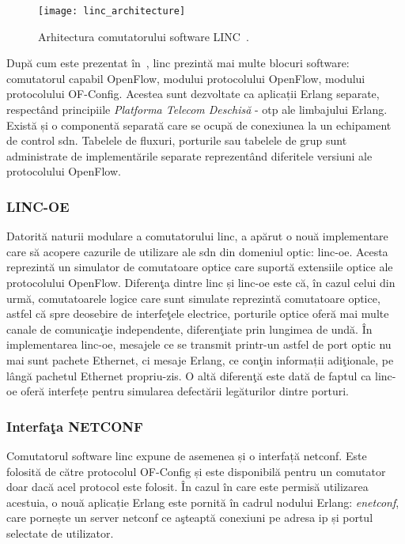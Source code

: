 \begin{figure}[h]
	\centering
	\texttt{[image: linc\_architecture]}
	\caption{Arhitectura comutatorului software LINC~\cite{linc2014qsg}.}
	\label{fig:linc_architecture}
\end{figure}

După cum este prezentat în~\cite{linc2014qsg}, \gls{linc} prezintă mai multe blocuri software: comutatorul capabil OpenFlow, modului protocolului OpenFlow, modului protocolului OF-Config. Acestea sunt dezvoltate ca aplicații Erlang separate, respectând principiile \textit{Platforma Telecom Deschisă} - \gls{otp} ale limbajului Erlang. Există și o componentă separată care se ocupă de conexiunea la un echipament de control \gls{sdn}. Tabelele de fluxuri, porturile sau tabelele de grup sunt administrate de implementările separate reprezentând diferitele versiuni ale protocolului OpenFlow.

\subsubsection{LINC-OE}

Datorită naturii modulare a comutatorului \gls{linc}, a apărut o nouă implementare care să acopere cazurile de utilizare ale \gls{sdn} din domeniul optic: \gls{linc-oe}. Acesta reprezintă un simulator de comutatoare optice care suportă extensiile optice ale protocolului OpenFlow. Diferenţa dintre \gls{linc} și \gls{linc-oe} este că, în cazul celui din urmă, comutatoarele logice care sunt simulate reprezintă comutatoare optice, astfel că spre deosebire de interfeţele electrice, porturile optice oferă mai multe canale de comunicaţie independente, diferenţiate prin lungimea de undă. În implementarea \gls{linc-oe}, mesajele ce se transmit printr-un astfel de port optic nu mai sunt pachete Ethernet, ci mesaje Erlang, ce conţin informații adiţionale, pe lângă pachetul Ethernet propriu-zis. O altă diferenţă este dată de faptul ca \gls{linc-oe} oferă interfețe pentru simularea defectării legăturilor dintre porturi.

\subsubsection{Interfaţa NETCONF}

Comutatorul software \gls{linc} expune de asemenea și o interfață \gls{netconf}. Este folosită de către protocolul OF-Config și este disponibilă pentru un comutator doar dacă acel protocol este folosit. În cazul în care este permisă utilizarea acestuia, o nouă aplicație Erlang este pornită în cadrul nodului Erlang: \textit{enetconf}, care pornește un server \gls{netconf} ce aşteaptă conexiuni pe adresa \gls{ip} și portul selectate de utilizator.

